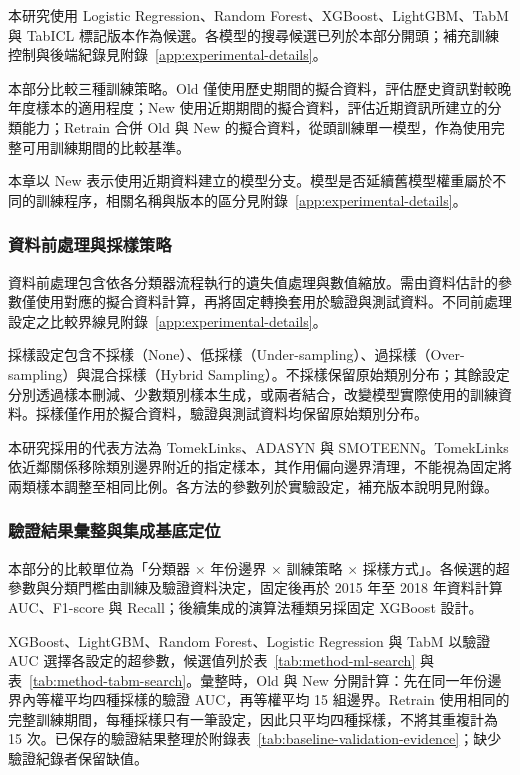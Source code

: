 本研究使用 Logistic Regression、Random Forest、XGBoost、LightGBM、TabM 與 TabICL 標記版本作為候選。各模型的搜尋候選已列於本部分開頭；補充訓練控制與後端紀錄見附錄~\ref{app:experimental-details}。

本部分比較三種訓練策略。Old 僅使用歷史期間的擬合資料，評估歷史資訊對較晚年度樣本的適用程度；New 使用近期期間的擬合資料，評估近期資訊所建立的分類能力；Retrain 合併 Old 與 New 的擬合資料，從頭訓練單一模型，作為使用完整可用訓練期間的比較基準。

本章以 New 表示使用近期資料建立的模型分支。模型是否延續舊模型權重屬於不同的訓練程序，相關名稱與版本的區分見附錄~\ref{app:experimental-details}。

\subsubsection{資料前處理與採樣策略}

資料前處理包含依各分類器流程執行的遺失值處理與數值縮放。需由資料估計的參數僅使用對應的擬合資料計算，再將固定轉換套用於驗證與測試資料。不同前處理設定之比較界線見附錄~\ref{app:experimental-details}。

採樣設定包含不採樣（None）、低採樣（Under-sampling）、過採樣（Over-sampling）與混合採樣（Hybrid Sampling）。不採樣保留原始類別分布；其餘設定分別透過樣本刪減、少數類別樣本生成，或兩者結合，改變模型實際使用的訓練資料。採樣僅作用於擬合資料，驗證與測試資料均保留原始類別分布。

本研究採用的代表方法為 TomekLinks、ADASYN 與 SMOTEENN。TomekLinks 依近鄰關係移除類別邊界附近的指定樣本，其作用偏向邊界清理，不能視為固定將兩類樣本調整至相同比例。各方法的參數列於實驗設定，補充版本說明見附錄。

\subsubsection{驗證結果彙整與集成基底定位}

本部分的比較單位為「分類器 \ensuremath{\times} 年份邊界 \ensuremath{\times} 訓練策略 \ensuremath{\times} 採樣方式」。各候選的超參數與分類門檻由訓練及驗證資料決定，固定後再於 2015 年至 2018 年資料計算 AUC、F1-score 與 Recall；後續集成的演算法種類另採固定 XGBoost 設計。

XGBoost、LightGBM、Random Forest、Logistic Regression 與 TabM 以驗證 AUC 選擇各設定的超參數，候選值列於表~\ref{tab:method-ml-search} 與表~\ref{tab:method-tabm-search}。彙整時，Old 與 New 分開計算：先在同一年份邊界內等權平均四種採樣的驗證 AUC，再等權平均 15 組邊界。Retrain 使用相同的完整訓練期間，每種採樣只有一筆設定，因此只平均四種採樣，不將其重複計為 15 次。已保存的驗證結果整理於附錄表~\ref{tab:baseline-validation-evidence}；缺少驗證紀錄者保留缺值。

